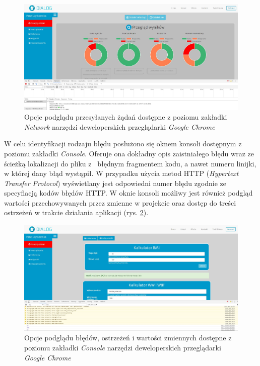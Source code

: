  \begin{figure}[h]
 	\centering\includegraphics[scale=0.3]{images/network.jpg}
 	\caption{Opcje podglądu przesyłanych żądań dostępne z poziomu zakładki \textit{Network} narzędzi deweloperskich przeglądarki \textit{Google Chrome}}
 	\label{Rys:network}
 \end{figure}

\newpage
  
W celu identyfikacji rodzaju błędu posłużono się oknem konsoli dostępnym z poziomu zakładki \textit{Console}. Oferuje ona dokładny opis zaistniałego błędu wraz ze ścieżką lokalizacji do pliku z~ błędnym fragmentem kodu, a nawet numeru linijki, w której dany błąd wystąpił. W przypadku użycia metod HTTP (\textit{Hypertext Transfer Protocol}) wyświetlany jest odpowiedni numer błędu zgodnie ze specyfiacją kodów błędów HTTP. W oknie konsoli możliwy jest również podgląd wartości przechowywanych przez zmienne w projekcie oraz dostęp do treści ostrzeżeń w trakcie działania aplikacji (rys. \ref{Rys:console}).
 

 \begin{figure}[h]
	\centering\includegraphics[scale=0.3]{images/console.jpg}
	\caption{Opcje podglądu błędów, ostrzeżeń i wartości zmiennych dostępne z poziomu zakładki \textit{Console} narzędzi deweloperskich przeglądarki \textit{Google Chrome}}
	\label{Rys:console}
 \end{figure}

